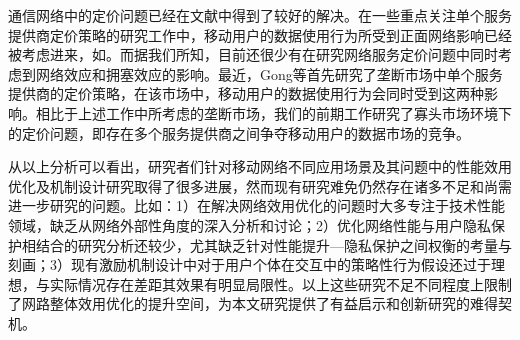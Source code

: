 通信网络中的定价问题已经在文献\cite{Walrand08,Huang10,Xinbin,CaoTVT,Xiaoming}中得到了较好的解决。在一些重点关注单个服务提供商定价策略的研究工作中，移动用户的数据使用行为所受到正面网络影响已经被考虑进来，如\cite{Hartline08,Candogan12,SwapnaES12}。而据我们所知，目前还很少有在研究网络服务定价问题中同时考虑到网络效应和拥塞效应的影响。最近，Gong等\cite{GongDCZ17}首先研究了垄断市场中单个服务提供商的定价策略，在该市场中，移动用户的数据使用行为会同时受到这两种影响。相比于上述工作中所考虑的垄断市场，我们的前期工作\cite{MYCISS16}研究了寡头市场环境下的定价问题，即存在多个服务提供商之间争夺移动用户的数据市场的竞争。

从以上分析可以看出，研究者们针对移动网络不同应用场景及其问题中的性能效用优化及机制设计研究取得了很多进展，然而现有研究难免仍然存在诸多不足和尚需进一步研究的问题。比如：1）在解决网络效用优化的问题时大多专注于技术性能领域，缺乏从网络外部性角度的深入分析和讨论；2）优化网络性能与用户隐私保护相结合的研究分析还较少，尤其缺乏针对性能提升—隐私保护之间权衡的考量与刻画；3）现有激励机制设计中对于用户个体在交互中的策略性行为假设还过于理想，与实际情况存在差距其效果有明显局限性。以上这些研究不足不同程度上限制了网路整体效用优化的提升空间，为本文研究提供了有益启示和创新研究的难得契机。
%
%
